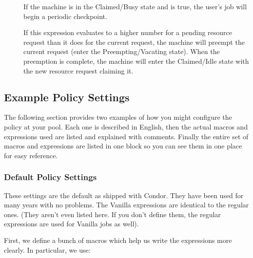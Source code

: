 \begin{description}
\item[] If the machine is in the
  Claimed/Busy state and  is true, the
  user's job will begin a periodic checkpoint.
  
\item[] If this expression evaluates to a higher number for
  a pending resource request than it does for the current request, the
  machine will preempt the current request (enter the
  Preempting/Vacating state).  When the preemption is complete, the
  machine will enter the Claimed/Idle state with the new resource
  request claiming it.

\end{description}

\subsection{Example Policy Settings}
\label{sec:Example-Policy}

The following section provides two examples of how you might configure
the policy at your pool.  Each one is described in English, then the
actual macros and expressions used are listed and explained with
comments.  Finally the entire set of macros and expressions are listed
in one block so you can see them in one place for easy reference.

\subsubsection{Default Policy Settings}
\label{sec:Default-Policy}

These settings are the default as shipped with Condor.  They have been
used for many years with no problems.  The Vanilla expressions are
identical to the regular ones. (They aren't even listed here.  If you
don't define them, the regular expressions are used for Vanilla jobs
as well).

First, we define a bunch of macros which help us write the expressions
more clearly.  In particular, we use:

